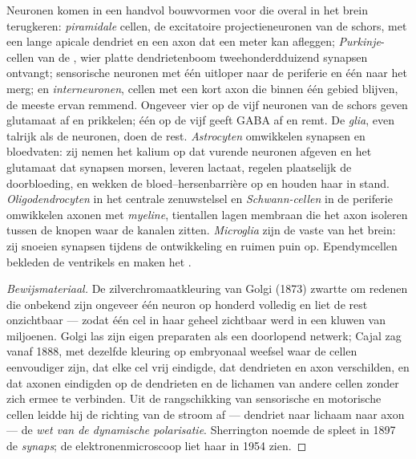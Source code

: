 \begin{definition}\label{def:b3:nervous-systems:cells}
Neuronen komen in een handvol bouwvormen voor die overal in het brein
terugkeren: \emph{piramidale} cellen, de excitatoire projectieneuronen
van de schors, met een lange apicale dendriet en een axon dat een meter
kan afleggen; \emph{Purkinje}-cellen van de , wier platte
dendrietenboom tweehonderdduizend synapsen ontvangt; sensorische
neuronen met één uitloper naar de periferie en één naar het merg; en
\emph{interneuronen}, cellen met een kort axon die binnen één gebied
blijven, de meeste ervan remmend. Ongeveer vier op de vijf neuronen van
de schors geven glutamaat af en prikkelen; één op de vijf geeft GABA af
en remt. De \emph{glia}, even talrijk als de neuronen, doen de rest.
\emph{Astrocyten} omwikkelen synapsen en bloedvaten: zij nemen het
kalium op dat vurende neuronen afgeven en het glutamaat dat synapsen
morsen, leveren lactaat, regelen plaatselijk de doorbloeding, en wekken
de bloed--hersenbarrière op en houden haar in stand.
\emph{Oligodendrocyten} in het centrale zenuwstelsel en
\emph{Schwann-cellen} in de periferie omwikkelen axonen met
\emph{myeline}, tientallen lagen membraan die het axon isoleren tussen
de knopen waar de kanalen zitten. \emph{Microglia} zijn de vaste
 van het brein: zij snoeien synapsen tijdens de ontwikkeling
en ruimen puin op. Ependymcellen bekleden de ventrikels en maken het
.
\end{definition}

\begin{proof}[Bewijsmateriaal]
De zilverchromaatkleuring van Golgi (1873) zwartte om redenen die
onbekend zijn ongeveer één neuron op honderd volledig en liet de rest
onzichtbaar ---
zodat één cel in haar geheel zichtbaar werd in een kluwen van
miljoenen. Golgi las zijn eigen preparaten als een doorlopend netwerk;
Cajal zag vanaf 1888, met dezelfde kleuring op embryonaal weefsel waar
de cellen eenvoudiger zijn, dat elke cel vrij eindigde, dat dendrieten
en axon verschilden, en dat axonen eindigden op de dendrieten en de
lichamen van andere cellen zonder zich ermee te verbinden. Uit de
rangschikking van sensorische en motorische cellen leidde hij de
richting van de stroom af --- dendriet naar lichaam naar axon --- de
\emph{wet van de dynamische polarisatie}. Sherrington noemde de spleet
in 1897 de \emph{synaps}; de elektronenmicroscoop liet haar in 1954
zien.
\end{proof}


